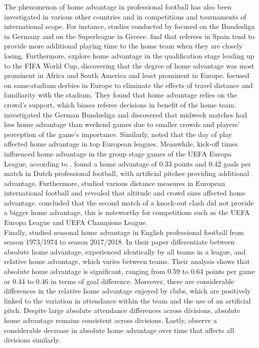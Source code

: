  \noindent
 The phenomenon of home advantage in professional football has also been investigated in various other countries and in competitions and tournaments of international scope. For instance, studies conducted by  focused on the Bundesliga in Germany and  on the Superleague in Greece.  find that referees in Spain tend to provide more additional playing time to the home team when they are closely losing. Furthermore,  explore home advantage in the qualification stage leading up to the FIFA World Cup, discovering that the degree of home advantage was most prominent in Africa and South America and least prominent in Europe.  focused on same-stadium derbies in Europe to eliminate the effects of travel distance and familiarity with the stadium. They found that home advantage relies on the crowd's support, which biases referee decisions in benefit of the home team.  investigated the German Bundesliga and discovered that midweek matches had less home advantage than weekend games due to smaller crowds and players' perception of the game's importance. Similarly,  noted that the day of play affected home advantage in top European leagues. Meanwhile, kick-off times influenced home advantage in the group stage games of the UEFA Europa League, according to .  found a home advantage of 0.33 points and 0.42 goals per match in Dutch professional football, with artificial pitches providing additional advantage. Furthermore,  studied various distance measures in European international football and revealed that altitude and crowd sizes affected home advantage.  concluded that the second match of a knock-out clash did not provide a bigger home advantage, this is noteworthy for competitions such as the UEFA Europa League and UEFA Champions League.\\

 \noindent
 Finally,  studied seasonal home advantage in English professional football from season 1973/1974 to season 2017/2018. In their paper  differentiate between absolute home advantage, experienced identically by all teams in a league, and relative home advantage, which varies between teams. Their analysis shows that absolute home advantage is significant, ranging from 0.59 to 0.64 points per game or 0.44 to 0.46 in terms of goal difference. Moreover, there are considerable differences in the relative home advantage enjoyed by clubs, which are positively linked to the variation in attendance within the team and the use of an artificial pitch. Despite large absolute attendance differences across divisions, absolute home advantage remains consistent across divisions. Lastly,  observe a considerable decrease in absolute home advantage over time that affects all divisions similarly.

